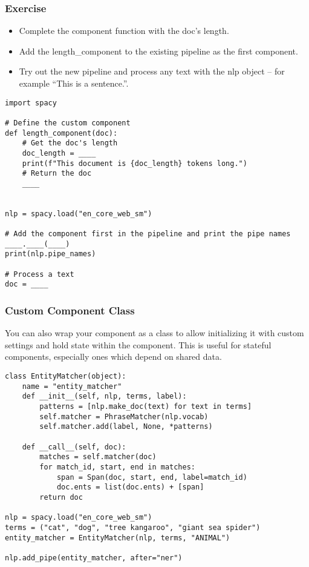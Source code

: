 \begin{frame}[fragile]\frametitle{Exercise}

  \begin{itemize}
    \item Complete the component function with the doc’s length.
    \item Add the length\_component to the existing pipeline as the first component.
    \item Try out the new pipeline and process any text with the nlp object – for example “This is a sentence.”.
  \end{itemize}

  \begin{lstlisting}
import spacy

# Define the custom component
def length_component(doc):
    # Get the doc's length
    doc_length = ____
    print(f"This document is {doc_length} tokens long.")
    # Return the doc
    ____


nlp = spacy.load("en_core_web_sm")

# Add the component first in the pipeline and print the pipe names
____.____(____)
print(nlp.pipe_names)

# Process a text
doc = ____
  \end{lstlisting}
	
\end{frame}


\begin{frame}[fragile]\frametitle{Custom Component Class}
You can also wrap your component as a class to allow initializing it with custom settings and hold state within the component. This is useful for stateful components, especially ones which depend on shared data.
		\begin{lstlisting}
class EntityMatcher(object):
    name = "entity_matcher"
    def __init__(self, nlp, terms, label):
        patterns = [nlp.make_doc(text) for text in terms]
        self.matcher = PhraseMatcher(nlp.vocab)
        self.matcher.add(label, None, *patterns)

    def __call__(self, doc):
        matches = self.matcher(doc)
        for match_id, start, end in matches:
            span = Span(doc, start, end, label=match_id)
            doc.ents = list(doc.ents) + [span]
        return doc

nlp = spacy.load("en_core_web_sm")
terms = ("cat", "dog", "tree kangaroo", "giant sea spider")
entity_matcher = EntityMatcher(nlp, terms, "ANIMAL")

nlp.add_pipe(entity_matcher, after="ner")
\end{lstlisting}	
	
\end{frame}

